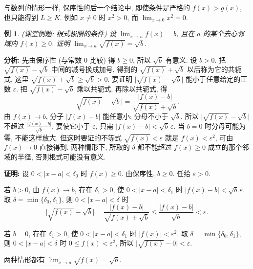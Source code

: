 \documentclass[UTF8,openany]{ctexbook}
\theoremstyle{chinesetextbook}
\newtheorem{example}{例}[section]
\newenvironment{cnproof}{\par\indent\textbf{证明:} \ignorespaces}{\par}
\begin{document}
与数列的情形一样, 保序性的后一个结论中, 即使条件是严格的 $f(x)>g(x)$, 也只能得到 $L\ge K$. 例如 $x\ne0$ 时 $x^2>0$, 而 $\displaystyle\lim_{x\to0}x^2=0$.
\begin{example}\label{ex:k16-1}
\textnormal{(课堂例题: 根式极限的条件)} 设 $\displaystyle\lim_{x\to a}f(x)=b$, 且在 $a$ 的某个去心邻域内 $f(x)\ge0$. 证明 $\displaystyle\lim_{x\to a}\sqrt{f(x)}=\sqrt b$.
\end{example}
\par\indent\textbf{分析:} 先由保序性 (与常数 $0$ 比较) 得 $b\ge0$, 所以 $\sqrt b$ 有意义. 设 $b>0$. 把 $\sqrt{f(x)}-\sqrt b$ 中间的减号换成加号, 得到的 $\sqrt{f(x)}+\sqrt b$ 以后称为它的共轭式, 这里 $\sqrt{f(x)}+\sqrt b\ge\sqrt b>0$. 要证明 $\bigl|\sqrt{f(x)}-\sqrt b\bigr|$ 能小于任意给定的正数 $\varepsilon$. 把 $\sqrt{f(x)}-\sqrt b$ 乘以共轭式, 再除以共轭式, 得
\[
\bigl|\sqrt{f(x)}-\sqrt b\bigr|=\frac{|f(x)-b|}{\sqrt{f(x)}+\sqrt b}.
\]
由 $f(x)\to b$, 分子 $|f(x)-b|$ 能任意小; 分母不小于 $\sqrt b$, 所以 $\bigl|\sqrt{f(x)}-\sqrt b\bigr|$ 不超过 $\displaystyle\frac{|f(x)-b|}{\sqrt b}$. 要使它小于 $\varepsilon$, 只需 $|f(x)-b|<\sqrt b\,\varepsilon$. 当 $b=0$ 时分母可能为零, 不能这样放大. 但这时要证的不等式 $\sqrt{f(x)}<\varepsilon$ 就是 $f(x)<\varepsilon^2$, 可由 $f(x)\to0$ 直接得到. 两种情形下, 所取的 $\delta$ 都不能超过 $f(x)\ge0$ 成立的那个邻域的半径, 否则根式可能没有意义.
\begin{cnproof}
设 $0<|x-a|<\delta_0$ 时 $f(x)\ge0$. 由保序性, $b\ge0$. 任给 $\varepsilon>0$.

若 $b>0$, 由 $f(x)\to b$, 存在 $\delta_1>0$, 使 $0<|x-a|<\delta_1$ 时 $|f(x)-b|<\sqrt b\,\varepsilon$. 取 $\delta=\min\{\delta_0,\delta_1\}$, 则 $0<|x-a|<\delta$ 时
\[
\bigl|\sqrt{f(x)}-\sqrt b\bigr|=\frac{|f(x)-b|}{\sqrt{f(x)}+\sqrt b}\le\frac{|f(x)-b|}{\sqrt b}<\varepsilon.
\]

若 $b=0$, 存在 $\delta_1>0$, 使 $0<|x-a|<\delta_1$ 时 $|f(x)|<\varepsilon^2$. 取 $\delta=\min\{\delta_0,\delta_1\}$, 则 $0<|x-a|<\delta$ 时 $0\le f(x)<\varepsilon^2$, 所以 $\bigl|\sqrt{f(x)}-0\bigr|<\varepsilon$.

两种情形都有 $\displaystyle\lim_{x\to a}\sqrt{f(x)}=\sqrt b$.
\end{cnproof}
\end{document}
